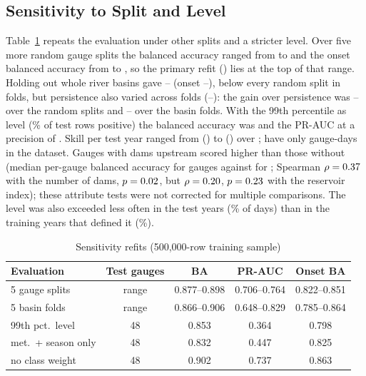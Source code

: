 \documentclass[conference]{IEEEtran}
\begin{document}
\subsection{Sensitivity to Split and Level}
\label{sec:robust}
Table~\ref{tab:robust} repeats the evaluation under other splits and a stricter level. Over five more random gauge splits the balanced accuracy ranged from \SplitBAMin{} to \SplitBAMax{} and the onset balanced accuracy from \SplitOnMin{} to \SplitOnMax, so the primary refit (\AblAllBA) lies at the top of that range. Holding out whole river basins gave \BasinBAMin--\BasinBAMax{} (onset \BasinOnMin--\BasinOnMax), below every random split in \BasinBelowSplits{} folds, but persistence also varied across folds (\BasinPersMin--\BasinPersMax): the gain over persistence was \SplitGainMin--\SplitGainMax{} over the random splits and \BasinGainMin--\BasinGainMax{} over the basin folds. With the 99th percentile as level (\QnnPrev\% of test rows positive) the balanced accuracy was \QnnBA{} and the PR-AUC \QnnPR{} at a precision of \QnnPrec. Skill per test year ranged from \YearMinBA{} (\YearMin) to \YearMaxBA{} (\YearMax) over \YearsBig; \YearsSmall{} have only \YearsSmallRows{} gauge-days in the dataset. Gauges with dams upstream scored higher than those without (median per-gauge balanced accuracy \RegBADams{} for \RegDams{} gauges against \RegBANoDams{} for \RegNoDams; Spearman $\rho=0.37$ with the number of dams, $p=0.02$, but $\rho=0.20$, $p=0.23$ with the reservoir index); these attribute tests were not corrected for multiple comparisons. The level was also exceeded less often in the test years (\NsTest\% of days) than in the training years that defined it (\NsTrain\%).

\begin{table}[t]
\caption{Sensitivity refits (500,000-row training sample)}
\label{tab:robust}
\centering
\footnotesize
\setlength{\tabcolsep}{1.8pt}
\begin{tabular}{lcccc}
\toprule
Evaluation & Test gauges & BA & PR-AUC & Onset BA\\
\midrule
5 gauge splits & range & 0.877--0.898 & 0.706--0.764 & 0.822--0.851\\
5 basin folds & range & 0.866--0.906 & 0.648--0.829 & 0.785--0.864\\
99th pct.\ level & 48 & 0.853 & 0.364 & 0.798\\
met.\ + season only & 48 & 0.832 & 0.447 & 0.825\\
no class weight & 48 & 0.902 & 0.737 & 0.863\\
\bottomrule
\end{tabular}
\end{table}
\end{document}
